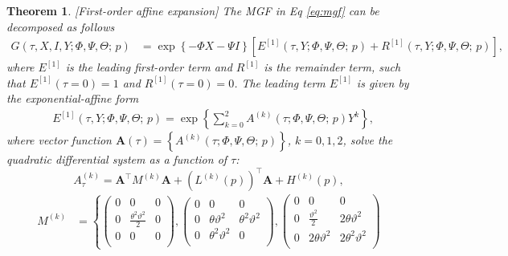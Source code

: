 \documentclass[pdftex,11pt,a4paper] {article}
\newtheorem{theorem}{Theorem}[section]
\begin{document}
\begin{theorem}\label{pr:b1} [First-order affine expansion] The MGF in Eq \eqref{eq:mgf} can be decomposed as follows
\begin{equation}\label{eq:b11}
\begin{split}
G(\tau,X,I,Y; \Phi,\Psi,\Theta;\,p)&= \exp \left\{-\Phi X-\Psi I \right\}  \left[E^{[1]}(\tau,Y; \Phi,\Psi,\Theta;\,p) + R^{[1]}(\tau,Y; \Phi,\Psi,\Theta;\,p) \right],
\end{split}
\end{equation}
 where $E^{[1]}$ is the leading first-order term and $R^{[1]}$ is the remainder term, such that $E^{[1]}(\tau=0)=1$ and $R^{[1]}(\tau=0)=0$. The leading term $E^{[1]}$ is given by the exponential-affine form
\begin{equation}\label{eq:b12}
\begin{split}
& E^{[1]}(\tau,Y; \Phi,\Psi,\Theta;\,p)= \exp \left\{\sum^{2}_{k=0}A^{(k)}(\tau;\Phi,\Psi,\Theta;\,p)Y^{k}  \right\},
\end{split}
\end{equation}
where vector function $\mathbf{A}(\tau)=\left\{A^{(k)}(\tau;\Phi,\Psi,\Theta;\,p)\right\}$, $k=0,1,2$, solve the quadratic differential system as a function of $\tau$:
\begin{equation}\label{eq:OrigMGFLogAndQVFirsOrder}
A^{(k)}_\tau=\mathbf{A}^\top M^{(k)}\mathbf{A} + \left(L^{(k)}(p)\right)^\top \mathbf{A} + H^{(k)}(p),
\end{equation}
\begin{equation*}
\begin{split}
M^{(k)}&=\left\{
\begin{pmatrix} %
0 & 0 & 0 \\
0 & \frac{\theta^2\vartheta^2}{2} & 0 \\
0 & 0 & 0 \\
\end{pmatrix}, 
\begin{pmatrix} %
0 & 0 & 0 \\
0 & \theta\vartheta^2 & \theta^2\vartheta^2 \\
0 & \theta^2\vartheta^2 & 0 \\
\end{pmatrix}, 
\begin{pmatrix} %
0 & 0 & 0 \\
0 & \frac{\vartheta^2}{2} & 2\theta\vartheta^2 \\
0 &  2\theta\vartheta^2  & 2\theta^2\vartheta^2 \\

\end{pmatrix}
\end{split}
\end{equation*}
\end{theorem}
\end{document}
